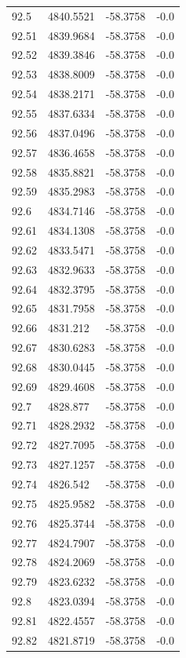 \begin{table}[H]
\begin{tabular}{llll}
92.5 & 4840.5521 & -58.3758 & -0.0 \\
92.51 & 4839.9684 & -58.3758 & -0.0 \\
92.52 & 4839.3846 & -58.3758 & -0.0 \\
92.53 & 4838.8009 & -58.3758 & -0.0 \\
92.54 & 4838.2171 & -58.3758 & -0.0 \\
92.55 & 4837.6334 & -58.3758 & -0.0 \\
92.56 & 4837.0496 & -58.3758 & -0.0 \\
92.57 & 4836.4658 & -58.3758 & -0.0 \\
92.58 & 4835.8821 & -58.3758 & -0.0 \\
92.59 & 4835.2983 & -58.3758 & -0.0 \\
92.6 & 4834.7146 & -58.3758 & -0.0 \\
92.61 & 4834.1308 & -58.3758 & -0.0 \\
92.62 & 4833.5471 & -58.3758 & -0.0 \\
92.63 & 4832.9633 & -58.3758 & -0.0 \\
92.64 & 4832.3795 & -58.3758 & -0.0 \\
92.65 & 4831.7958 & -58.3758 & -0.0 \\
92.66 & 4831.212 & -58.3758 & -0.0 \\
92.67 & 4830.6283 & -58.3758 & -0.0 \\
92.68 & 4830.0445 & -58.3758 & -0.0 \\
92.69 & 4829.4608 & -58.3758 & -0.0 \\
92.7 & 4828.877 & -58.3758 & -0.0 \\
92.71 & 4828.2932 & -58.3758 & -0.0 \\
92.72 & 4827.7095 & -58.3758 & -0.0 \\
92.73 & 4827.1257 & -58.3758 & -0.0 \\
92.74 & 4826.542 & -58.3758 & -0.0 \\
92.75 & 4825.9582 & -58.3758 & -0.0 \\
92.76 & 4825.3744 & -58.3758 & -0.0 \\
92.77 & 4824.7907 & -58.3758 & -0.0 \\
92.78 & 4824.2069 & -58.3758 & -0.0 \\
92.79 & 4823.6232 & -58.3758 & -0.0 \\
92.8 & 4823.0394 & -58.3758 & -0.0 \\
92.81 & 4822.4557 & -58.3758 & -0.0 \\
92.82 & 4821.8719 & -58.3758 & -0.0 \\

\end{tabular}
\end{table}
